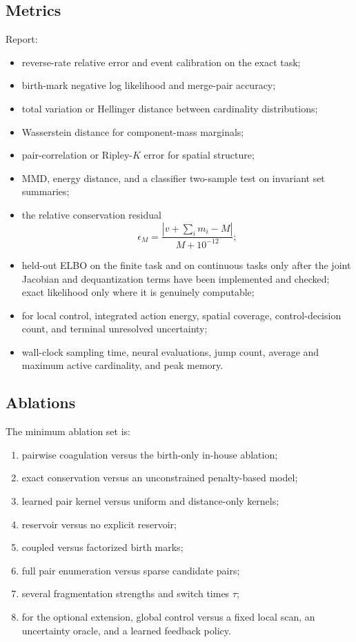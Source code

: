 \documentclass[10pt]{article}
\theoremstyle{definition}
\theoremstyle{remark}
\begin{document}
\subsection{Metrics}

Report:
\begin{itemize}
  \item reverse-rate relative error and event calibration on the exact task;
  \item birth-mark negative log likelihood and merge-pair accuracy;
  \item total variation or Hellinger distance between cardinality distributions;
  \item Wasserstein distance for component-mass marginals;
  \item pair-correlation or Ripley-$K$ error for spatial structure;
  \item MMD, energy distance, and a classifier two-sample test on invariant set summaries;
  \item the relative conservation residual
  \begin{equation}
    \epsilon_M=
    \frac{|v+\sum_i m_i-M|}{M+10^{-12}};
    \label{eq:conservation-metric}
  \end{equation}
  \item held-out ELBO on the finite task and on continuous tasks only after
  the joint Jacobian and dequantization terms have been implemented and
  checked; exact likelihood only where it is genuinely computable;
  \item for local control, integrated action energy, spatial coverage,
  control-decision count, and terminal unresolved uncertainty;
  \item wall-clock sampling time, neural evaluations, jump count, average and maximum active cardinality, and peak memory.
\end{itemize}

\subsection{Ablations}

The minimum ablation set is:
\begin{enumerate}
  \item pairwise coagulation versus the birth-only in-house ablation;
  \item exact conservation versus an unconstrained penalty-based model;
  \item learned pair kernel versus uniform and distance-only kernels;
  \item reservoir versus no explicit reservoir;
  \item coupled versus factorized birth marks;
  \item full pair enumeration versus sparse candidate pairs;
  \item several fragmentation strengths and switch times $\tau$;
  \item for the optional extension, global control versus a fixed local scan,
  an uncertainty oracle, and a learned feedback policy.
\end{enumerate}
\end{document}

